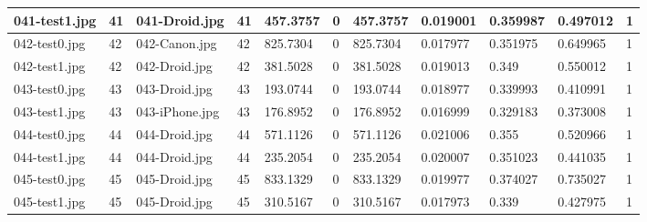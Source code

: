 \begin{landscape}
\begin{longtable}{|p{2cm}|p{1cm}|p{2cm}|p{1cm}|p{2cm}|p{1cm}|p{2cm}|p{2cm}|p{2cm}|p{2cm}|p{1cm}|}
	041-test1.jpg   & 41               & 041-Droid.jpg         & 41                          & 457.3757              & 0                       & 457.3757                   & 0.019001              & 0.359987              & 0.497012                 & 1                \\ \hline
	042-test0.jpg   & 42               & 042-Canon.jpg         & 42                          & 825.7304              & 0                       & 825.7304                   & 0.017977              & 0.351975              & 0.649965                 & 1                \\ \hline
	042-test1.jpg   & 42               & 042-Droid.jpg         & 42                          & 381.5028              & 0                       & 381.5028                   & 0.019013              & 0.349                 & 0.550012                 & 1                \\ \hline
	043-test0.jpg   & 43               & 043-Droid.jpg         & 43                          & 193.0744              & 0                       & 193.0744                   & 0.018977              & 0.339993              & 0.410991                 & 1                \\ \hline
	043-test1.jpg   & 43               & 043-iPhone.jpg        & 43                          & 176.8952              & 0                       & 176.8952                   & 0.016999              & 0.329183              & 0.373008                 & 1                \\ \hline
	044-test0.jpg   & 44               & 044-Droid.jpg         & 44                          & 571.1126              & 0                       & 571.1126                   & 0.021006              & 0.355                 & 0.520966                 & 1                \\ \hline
	044-test1.jpg   & 44               & 044-Droid.jpg         & 44                          & 235.2054              & 0                       & 235.2054                   & 0.020007              & 0.351023              & 0.441035                 & 1                \\ \hline
	045-test0.jpg   & 45               & 045-Droid.jpg         & 45                          & 833.1329              & 0                       & 833.1329                   & 0.019977              & 0.374027              & 0.735027                 & 1                \\ \hline
	045-test1.jpg   & 45               & 045-Droid.jpg         & 45                          & 310.5167              & 0                       & 310.5167                   & 0.017973              & 0.339                 & 0.427975                 & 1                \\ \hline

\end{longtable}
\end{landscape}
